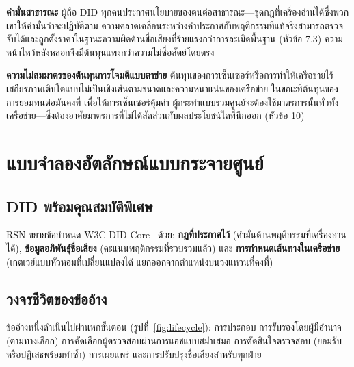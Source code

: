 \documentclass[11pt,a4paper,twocolumn]{article}
\begin{document}
\textbf{คำมั่นสาธารณะ} ผู้ถือ DID ทุกคนประกาศนโยบายของตนต่อสาธารณะ---ชุดกฎที่เครื่องอ่านได้ซึ่งพวกเขาให้คำมั่นว่าจะปฏิบัติตาม ความคลาดเคลื่อนระหว่างคำประกาศกับพฤติกรรมที่แท้จริงสามารถตรวจจับได้และถูกตั้งราคาในฐานะความผิดด้านชื่อเสียงที่ร้ายแรงกว่าการละเมิดพื้นฐาน (หัวข้อ 7.3) ความหน้าไหว้หลังหลอกจึงมีต้นทุนแพงกว่าความไม่ซื่อสัตย์โดยตรง

\textbf{ความไม่สมมาตรของต้นทุนการโจมตีแบบตาข่าย} ต้นทุนของการเซ็นเซอร์หรือการทำให้เครือข่ายไร้เสถียรภาพเติบโตแบบไม่เป็นเชิงเส้นตามขนาดและความหนาแน่นของเครือข่าย ในขณะที่ต้นทุนของการยอมทนต่อมันคงที่ เพื่อให้การเซ็นเซอร์คุ้มค่า ผู้กระทำแบบรวมศูนย์จะต้องใช้มาตรการนั้นทั่วทั้งเครือข่าย---ซึ่งต้องอาศัยมาตรการที่ไม่ได้สัดส่วนกับผลประโยชน์ใดที่นึกออก (หัวข้อ 10)

\section{แบบจำลองอัตลักษณ์แบบกระจายศูนย์}

\subsection{DID พร้อมคุณสมบัติพิเศษ}

RSN ขยายข้อกำหนด W3C DID Core~\cite{did2022} ด้วย: \textbf{กฎที่ประกาศไว้} (คำมั่นด้านพฤติกรรมที่เครื่องอ่านได้), \textbf{ข้อมูลอภิพันธุ์ชื่อเสียง} (คะแนนพฤติกรรมที่รวบรวมแล้ว) และ \textbf{การกำหนดเส้นทางในเครือข่าย} (เกตเวย์แบบหัวหอมที่เปลี่ยนแปลงได้ แยกออกจากตำแหน่งบนวงแหวนที่คงที่)

\subsection{วงจรชีวิตของข้ออ้าง}

ข้ออ้างหนึ่งดำเนินไปผ่านหกขั้นตอน (รูปที่~\ref{fig:lifecycle}): การประกอบ การรับรองโดยผู้มีอำนาจ (ตามทางเลือก) การคัดเลือกผู้ตรวจสอบผ่านการแฮชแบบสม่ำเสมอ การตัดสินใจตรวจสอบ (ยอมรับหรือปฏิเสธพร้อมทำซ้ำ) การเผยแพร่ และการปรับปรุงชื่อเสียงสำหรับทุกฝ่าย
\end{document}
